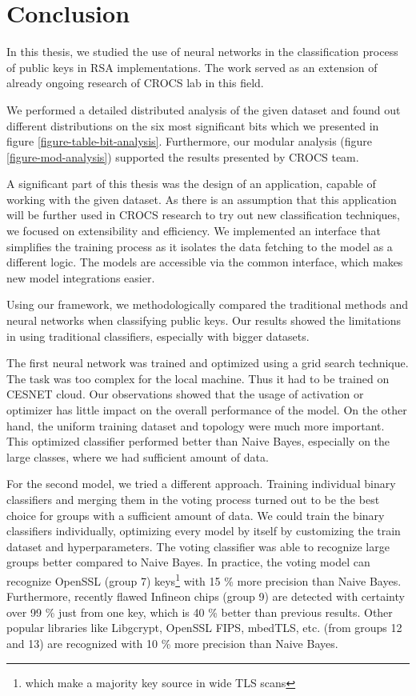 \chapter{Conclusion}

In this thesis, we studied the use of neural networks in the classification process of public keys in RSA implementations. The work served as an extension of already ongoing research of CROCS lab in this field. 

We performed a detailed distributed analysis of the given dataset and found out different distributions on the six most significant bits which we presented in figure \ref{figure-table-bit-analysis}. Furthermore, our modular analysis (figure \ref{figure-mod-analysis}) supported the results presented by CROCS team.

A significant part of this thesis was the design of an application, capable of working with the given dataset. As there is an assumption that this application will be further used in CROCS research to try out new classification techniques, we focused on extensibility and efficiency. We implemented an interface that simplifies the training process as it isolates the data fetching to the model as a different logic. The models are accessible via the common interface, which makes new model integrations easier.

Using our framework, we methodologically compared the traditional methods and neural networks when classifying public keys. Our results showed the limitations in using traditional classifiers, especially with bigger datasets.

The first neural network was trained and optimized using a grid search technique. The task was too complex for the local machine. Thus it had to be trained on CESNET cloud. Our observations showed that the usage of activation or optimizer has little impact on the overall performance of the model. On the other hand, the uniform training dataset and topology were much more important. This optimized classifier performed better than Naive Bayes, especially on the large classes, where we had sufficient amount of data.

For the second model, we tried a different approach. Training individual binary classifiers and merging them in the voting process
turned out to be the best choice for groups with a sufficient amount of data. We could train the binary classifiers individually, optimizing every model by itself by customizing the train dataset and hyperparameters. The voting classifier was able to recognize large groups better compared to Naive Bayes. In practice, the voting model can recognize OpenSSL (group 7) keys\footnote{which make a majority key source in wide TLS scans} with 15 \% more precision than Naive Bayes. Furthermore, recently flawed Infineon chips (group 9) are detected with certainty over 99 \% just from one key, which is 40 \% better than previous results. Other popular libraries like Libgcrypt, OpenSSL FIPS, mbedTLS, etc. (from groups 12 and 13) are recognized with 10 \% more precision than Naive Bayes. 

